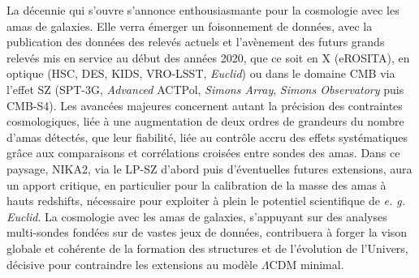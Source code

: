 La décennie qui s'ouvre s'annonce enthousiasmante pour la cosmologie avec les amas de galaxies. 
%
Elle verra émerger un foisonnement de données, avec la publication des données des relevés actuels et l'avènement des futurs grands relevés mis en service au début des années 2020, que ce soit en X (eROSITA), en optique (HSC, DES, KIDS, VRO-LSST, \emph{Euclid}) ou dans le domaine CMB via l'effet SZ (SPT-3G, \emph{Advanced} ACTPol, \emph{Simons Array}, \emph{Simons Observatory} puis CMB-S4).
%
Les avancées majeures concernent autant la précision des contraintes cosmologiques, liée à une augmentation de deux ordres de grandeurs du nombre d'amas détectés, que leur fiabilité, liée au contrôle accru des effets systématiques grâce aux comparaisons et corrélations croisées entre sondes des amas.
%
Dans ce paysage, NIKA2, via le LP-SZ d'abord puis d'éventuelles futures extensions, aura un apport critique, en particulier pour la calibration de la masse des amas à hauts redshifts, nécessaire pour exploiter à plein le potentiel scientifique de \emph{e. g. Euclid}.
%     
La cosmologie avec les amas de galaxies, s'appuyant sur des analyses multi-sondes fondées sur de vastes jeux de données, contribuera à forger la vison globale et cohérente de la formation des structures et de l'évolution de l'Univers, décisive pour contraindre les extensions au modèle $\Lambda$CDM minimal.  



             
     
       


